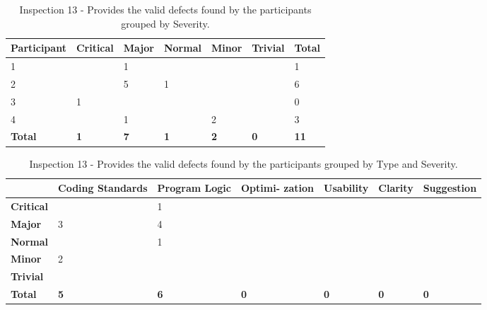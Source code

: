 \begin{table}[!h]
  \begin{center}
    \caption[Inspection 13 - Results by Severity]{Inspection 13
      - Provides the valid defects found by the participants grouped by
      Severity.}
    \label{tab:inspection-results-13}
    \begin{tabular}{|p{2.0cm}|p{1.5cm}|p{1.5cm}|p{1.5cm}|p{1.5cm}|p{1.5cm}|p{1.5cm}|} \hline
{\bf Participant} & {\bf Critical} & {\bf Major} 
& {\bf Normal} & {\bf Minor} & {\bf Trivial} & {\bf Total} \\ \hline
1 &   & 1 &   &   &   & 1 \\ \hline
2 &   & 5 & 1 &   &   & 6 \\ \hline
3 & 1 &   &   &   &   & 0 \\ \hline
4 &   & 1 &   & 2 &   & 3 \\ \hline
{\bf Total} & {\bf 1} & {\bf 7} & {\bf 1} & {\bf 2} & {\bf 0} & {\bf 11} \\ \hline
    \end{tabular}
  \end{center}
\end{table}

\begin{table}[!h]
  \begin{center}
    \caption[Inspection 13 - Results by Type and Severity]{Inspection 13 -
      Provides the valid defects found by the participants grouped by Type
      and Severity.}
    \label{tab:inspection-results-13-type}
    \begin{tabular}{|p{2.0cm}|p{1.7cm}|p{1.5cm}|p{1.7cm}|p{1.4cm}|p{1.4cm}|p{1.5cm}|}  \hline   
\small{} & \small{}{\bf Coding Standards} & 
\small{}{\bf Program Logic} & \small{} {\bf Optimi- zation} & 
\small{}{\bf Usability} & \small{} {\bf Clarity} & 
\small{} {\bf Suggestion} \\ \hline

{\bf Critical} &   & 1 &   &   &   &   \\ \hline
{\bf Major}    & 3 & 4 &   &   &   &   \\ \hline
{\bf Normal}   &   & 1 &   &   &   &   \\ \hline
{\bf Minor}    & 2 &   &   &   &   &   \\ \hline
{\bf Trivial}  &   &   &   &   &   &   \\ \hline

{\bf Total} & {\bf 5} & {\bf 6} & {\bf 0} & {\bf 0} & {\bf 0} & {\bf 0} \\ \hline
    \end{tabular}
  \end{center}
\end{table}


